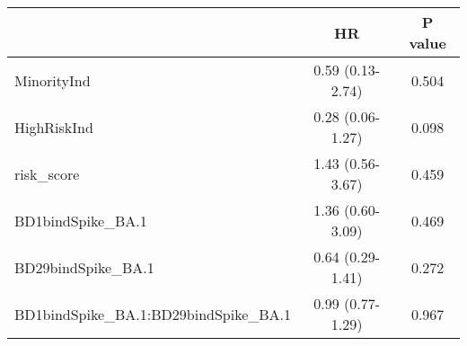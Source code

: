 \begin{tabular}{lcc}
   \hline  &HR& P value\\ 
\hline
MinorityInd & 0.59 (0.13-2.74) & 0.504 \\ 
  HighRiskInd & 0.28 (0.06-1.27) & 0.098 \\ 
  risk\_score & 1.43 (0.56-3.67) & 0.459 \\ 
  BD1bindSpike\_BA.1 & 1.36 (0.60-3.09) & 0.469 \\ 
  BD29bindSpike\_BA.1 & 0.64 (0.29-1.41) & 0.272 \\ 
  BD1bindSpike\_BA.1:BD29bindSpike\_BA.1 & 0.99 (0.77-1.29) & 0.967 \\ 
   \hline
\end{tabular}
